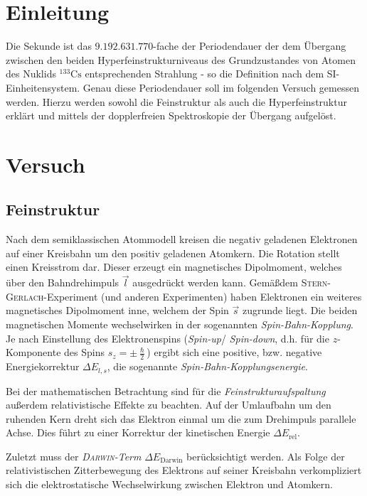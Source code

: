 \documentclass[../bericht.tex]{subfiles}
\begin{document}
  \chapter{Einleitung}

    Die Sekunde ist das $9.192.631.770$-fache der Periodendauer der dem Übergang zwischen den beiden Hyperfeinstrukturniveaus des Grundzustandes von Atomen des Nuklids $\mathrm{^{133}Cs}$ entsprechenden Strahlung - so die Definition nach dem SI-Einheitensystem. Genau diese Periodendauer soll im folgenden Versuch gemessen werden. Hierzu werden sowohl die Feinstruktur als auch die Hyperfeinstruktur erklärt und mittels der dopplerfreien Spektroskopie der Übergang aufgelöst.


  \chapter{Versuch}

    \section{Feinstruktur}
    \label{sec:feinstruktur}

      Nach dem semiklassischen Atommodell kreisen die negativ geladenen Elektronen auf einer Kreisbahn um den positiv geladenen Atomkern. Die Rotation stellt einen Kreisstrom dar. Dieser erzeugt ein magnetisches Dipolmoment, welches über den Bahndrehimpuls $\vec{l}$ ausgedrückt werden kann. Gemä\ss dem \textsc{Stern-Gerlach}-Experiment (und anderen Experimenten) haben Elektronen ein weiteres magnetisches Dipolmoment inne, welchem der Spin $\vec{s}$ zugrunde liegt. Die beiden magnetischen Momente wechselwirken in der sogenannten \textit{Spin-Bahn-Kopplung}. Je nach Einstellung des Elektronenspins (\textit{Spin-up}/ \textit{Spin-down}, d.h. für die $z$-Komponente des Spins $s_z=\pm \frac{\hslash}{2}$) ergibt sich eine positive, bzw. negative Energiekorrektur $\Delta E_{l,s}$, die sogenannte \textit{Spin-Bahn-Kopplungsenergie}.

      Bei der mathematischen Betrachtung sind für die \textit{Feinstrukturaufspaltung} außerdem relativistische Effekte zu beachten. Auf der Umlaufbahn um den ruhenden Kern dreht sich das Elektron einmal um die zum Drehimpuls parallele Achse. Dies führt zu einer Korrektur der kinetischen Energie $\Delta E_\mathrm{rel}$.

      Zuletzt muss der \textit{\textsc{Darwin}-Term} $\Delta E_\mathrm{Darwin}$ berücksichtigt werden. Als Folge der relativistischen Zitterbewegung des Elektrons auf seiner Kreisbahn verkompliziert sich die elektrostatische Wechselwirkung zwischen Elektron und Atomkern.
      \medskip
\end{document}

